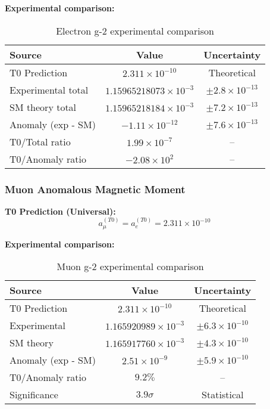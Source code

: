 \documentclass[12pt,a4paper]{article}
\begin{document}
	\textbf{Experimental comparison:}
	\begin{table}[htbp]
		\centering
		\caption{Electron g-2 experimental comparison}
		\label{tab:electron_g2_comparison}
		\begin{tabular}{lcc}
			\toprule
			\textbf{Source} & \textbf{Value} & \textbf{Uncertainty} \\
			\midrule
			T0 Prediction & $2.311 \times 10^{-10}$ & Theoretical \\
			Experimental total & $1.15965218073 \times 10^{-3}$ & $\pm 2.8 \times 10^{-13}$ \\
			SM theory total & $1.15965218184 \times 10^{-3}$ & $\pm 7.2 \times 10^{-13}$ \\
			Anomaly (exp - SM) & $-1.11 \times 10^{-12}$ & $\pm 7.6 \times 10^{-13}$ \\
			\midrule
			T0/Total ratio & $1.99 \times 10^{-7}$ & -- \\
			T0/Anomaly ratio & $-2.08 \times 10^{2}$ & -- \\
			\bottomrule
		\end{tabular}
	\end{table}
	
	\subsubsection{Muon Anomalous Magnetic Moment}
	
	\textbf{T0 Prediction (Universal):}
	\begin{equation}
		a_{\mu}^{(T0)} = a_e^{(T0)} = 2.311 \times 10^{-10}
		\label{eq:muon_g2_verification}
	\end{equation}
	
	\textbf{Experimental comparison:}
	\begin{table}[htbp]
		\centering
		\caption{Muon g-2 experimental comparison}
		\label{tab:muon_g2_comparison}
		\begin{tabular}{lcc}
			\toprule
			\textbf{Source} & \textbf{Value} & \textbf{Uncertainty} \\
			\midrule
			T0 Prediction & $2.311 \times 10^{-10}$ & Theoretical \\
			Experimental & $1.165920989 \times 10^{-3}$ & $\pm 6.3 \times 10^{-10}$ \\
			SM theory & $1.165917760 \times 10^{-3}$ & $\pm 4.3 \times 10^{-10}$ \\
			Anomaly (exp - SM) & $2.51 \times 10^{-9}$ & $\pm 5.9 \times 10^{-10}$ \\
			\midrule
			T0/Anomaly ratio & $9.2\%$ & -- \\
			Significance & $3.9\sigma$ & Statistical \\
			\bottomrule
		\end{tabular}
	\end{table}
	
\end{document}
